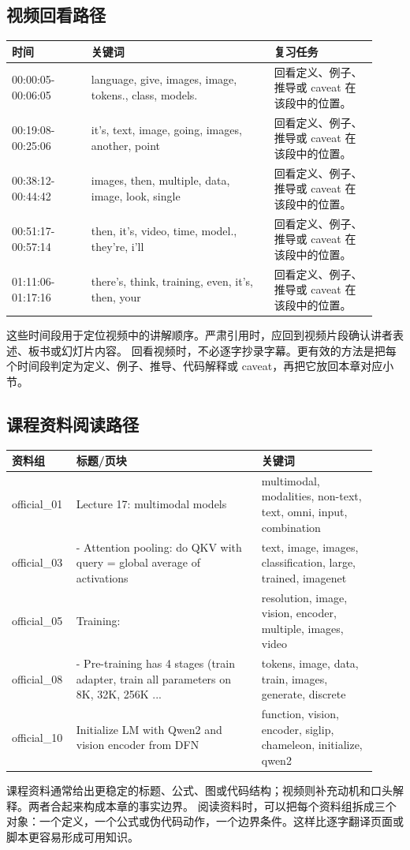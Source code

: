 \documentclass[a4paper]{article}
\begin{document}
\subsection{视频回看路径}
\begin{longtable}{p{0.20\linewidth}p{0.46\linewidth}p{0.26\linewidth}}
\toprule
\textbf{时间} & \textbf{关键词} & \textbf{复习任务}\\
\midrule
00:00:05-00:06:05 & language, give, images, image, tokens., class, models. & 回看定义、例子、推导或 caveat 在该段中的位置。\\
00:19:08-00:25:06 & it's, text, image, going, images, another, point & 回看定义、例子、推导或 caveat 在该段中的位置。\\
00:38:12-00:44:42 & images, then, multiple, data, image, look, single & 回看定义、例子、推导或 caveat 在该段中的位置。\\
00:51:17-00:57:14 & then, it's, video, time, model., they're, i'll & 回看定义、例子、推导或 caveat 在该段中的位置。\\
01:11:06-01:17:16 & there's, think, training, even, it's, then, your & 回看定义、例子、推导或 caveat 在该段中的位置。\\
\bottomrule
\end{longtable}
这些时间段用于定位视频中的讲解顺序。严肃引用时，应回到视频片段确认讲者表述、板书或幻灯片内容。
回看视频时，不必逐字抄录字幕。更有效的方法是把每个时间段判定为定义、例子、推导、代码解释或 caveat，再把它放回本章对应小节。
\subsection{课程资料阅读路径}
\begin{longtable}{p{0.14\linewidth}p{0.48\linewidth}p{0.30\linewidth}}
\toprule
\textbf{资料组} & \textbf{标题/页块} & \textbf{关键词}\\
\midrule
official\_01 & Lecture 17: multimodal models & multimodal, modalities, non-text, text, omni, input, combination\\
official\_03 & - Attention pooling: do QKV with query = global average of activations & text, image, images, classification, large, trained, imagenet\\
official\_05 & Training: & resolution, image, vision, encoder, multiple, images, video\\
official\_08 & - Pre-training has 4 stages (train adapter, train all parameters on 8K, 32K, 256K ... & tokens, image, data, train, images, generate, discrete\\
official\_10 & Initialize LM with Qwen2 and vision encoder from DFN & function, vision, encoder, siglip, chameleon, initialize, qwen2\\
\bottomrule
\end{longtable}
课程资料通常给出更稳定的标题、公式、图或代码结构；视频则补充动机和口头解释。两者合起来构成本章的事实边界。
阅读资料时，可以把每个资料组拆成三个对象：一个定义，一个公式或伪代码动作，一个边界条件。这样比逐字翻译页面或脚本更容易形成可用知识。
\end{document}
